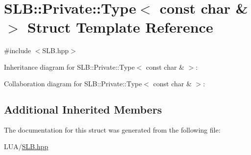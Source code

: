 \hypertarget{structSLB_1_1Private_1_1Type_3_01const_01char_01_6_01_4}{}\section{S\+LB\+:\+:Private\+:\+:Type$<$ const char \& $>$ Struct Template Reference}
\label{structSLB_1_1Private_1_1Type_3_01const_01char_01_6_01_4}


{\ttfamily \#include $<$S\+L\+B.\+hpp$>$}



Inheritance diagram for S\+LB\+:\+:Private\+:\+:Type$<$ const char \& $>$\+:


Collaboration diagram for S\+LB\+:\+:Private\+:\+:Type$<$ const char \& $>$\+:
\subsection*{Additional Inherited Members}


The documentation for this struct was generated from the following file\+:\begin{DoxyCompactItemize}
\item 
L\+U\+A/\hyperlink{SLB_8hpp}{S\+L\+B.\+hpp}\end{DoxyCompactItemize}
